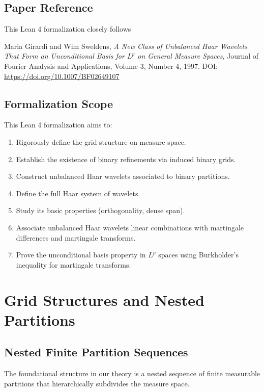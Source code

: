 \documentclass[12pt,a4paper]{article}
\theoremstyle{definition}
\newcommand{\Lp}[1]{L^{#1}}
\begin{document}
\subsection{Paper Reference}

This Lean 4 formalization  closely follows

\noindent
Maria Girardi and Wim Sweldens,  
\textit{A New Class of Unbalanced Haar Wavelets That Form an Unconditional Basis for $\Lp{p}$ on General Measure Spaces},  
Journal of Fourier Analysis and Applications, Volume 3, Number 4, 1997.  
DOI: \url{https://doi.org/10.1007/BF02649107}

\subsection{Formalization Scope}

This Lean 4 formalization aims to:
\begin{enumerate}
  \item Rigorously define the grid structure on measure space.
  \item Establish the existence of binary refinements via induced binary grids.
  \item Construct unbalanced Haar wavelets associated to binary partitions.
  \item Define the full Haar system of wavelets. 
  \item Study its basic properties (orthogonality, dense span).
  \item Associate unbalanced Haar wavelets linear combinations with   martingale differences and martingale transforms.
  \item Prove the unconditional basis property in $\Lp{p}$ spaces using Burkholder's inequality for martingale transforms.
\end{enumerate}

\newpage

\section{Grid Structures and Nested Partitions}

\subsection{Nested Finite Partition Sequences}

The foundational structure in our theory is a nested sequence of finite measurable partitions that hierarchically subdivides the measure space.
\end{document}

